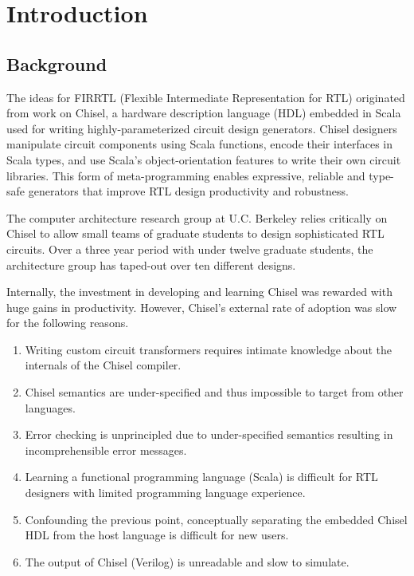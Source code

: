 \documentclass[12pt]{article}
\begin{document}
\maketitle
\tableofcontents
\newpage


\section{Introduction}

\subsection{Background}
The ideas for FIRRTL (Flexible Intermediate Representation for RTL) originated from work on Chisel, a hardware description language (HDL) embedded in Scala used for writing highly-parameterized circuit design generators. Chisel designers manipulate circuit components using Scala functions, encode their interfaces in Scala types, and use Scala's object-orientation features to write their own circuit libraries. This form of meta-programming enables expressive, reliable and type-safe generators that improve RTL design productivity and robustness.

The computer architecture research group at U.C. Berkeley relies critically on Chisel to allow small teams of graduate students to design sophisticated RTL circuits. Over a three year period with under twelve graduate students, the architecture group has taped-out over ten different designs.

Internally, the investment in developing and learning Chisel was rewarded with huge gains in productivity. However, Chisel's external rate of adoption was slow for the following reasons.
\begin{enumerate}[topsep=3pt,itemsep=-0.5ex,partopsep=1ex,parsep=1ex]
\item Writing custom circuit transformers requires intimate knowledge about the internals of the Chisel compiler.
\item Chisel semantics are under-specified and thus impossible to target from other languages.
\item Error checking is unprincipled due to under-specified semantics resulting in incomprehensible error messages.
\item Learning a functional programming language (Scala) is difficult for RTL designers with limited programming language experience.
\item Confounding the previous point, conceptually separating the embedded Chisel HDL from the host language is difficult for new users.
\item The output of Chisel (Verilog) is unreadable and slow to simulate.
\end{enumerate}
\end{document}
